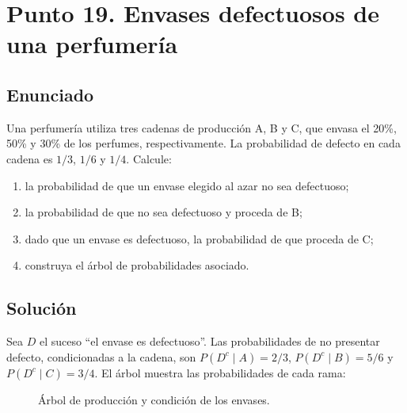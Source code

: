 \documentclass[12pt]{article}
\begin{document}
\section*{Punto 19. Envases defectuosos de una perfumería}

\subsection*{Enunciado}

Una perfumería utiliza tres cadenas de producción A, B y C, que envasa el 20\%, 50\% y 30\% de los perfumes, respectivamente. La probabilidad de defecto en cada cadena es $1/3$, $1/6$ y $1/4$. Calcule:

\begin{enumerate}
    \item la probabilidad de que un envase elegido al azar no sea defectuoso;
    \item la probabilidad de que no sea defectuoso y proceda de B;
    \item dado que un envase es defectuoso, la probabilidad de que proceda de C;
    \item construya el árbol de probabilidades asociado.
\end{enumerate}

\subsection*{Solución}

Sea $D$ el suceso ``el envase es defectuoso''. Las probabilidades de no presentar defecto, condicionadas a la cadena, son $P(D^c\mid A)=2/3$, $P(D^c\mid B)=5/6$ y $P(D^c\mid C)=3/4$. El árbol muestra las probabilidades de cada rama:

\begin{figure}[H]
\centering
{}
\caption{Árbol de producción y condición de los envases.}
\label{fig:arbol-perfumeria}
\end{figure}
\end{document}
